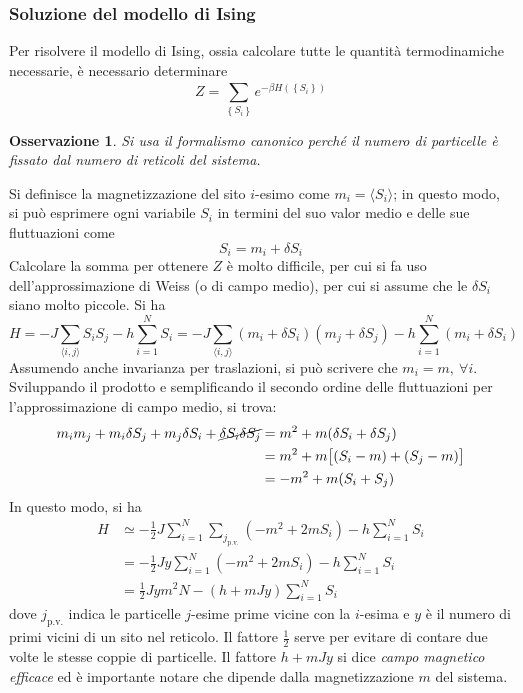 \documentclass[11pt, a4paper]{scrartcl}
\theoremstyle{style}
\newtheorem{osservazione}{Osservazione}[section]
\theoremstyle{style1}
\numberwithin{equation}{subsection}
\begin{document}
\subsubsection{Soluzione del modello di Ising}
Per risolvere il modello di Ising, ossia calcolare tutte le quantit\`a termodinamiche necessarie, \`e necessario determinare 
\[
Z = \sum_{\left\{ S_i \right\} }^{} e^{-\beta H\left(\left\{ S_i \right\} \right) }
\] 
\begin{osservazione}
Si usa il formalismo canonico perch\'e il numero di particelle \`e fissato dal numero di reticoli del sistema.
\end{osservazione}
\noindent Si definisce la magnetizzazione del sito $i$-esimo come $m_i = \langle S_i \rangle$; in questo modo, si pu\`o esprimere ogni variabile $S_i$ in termini del suo valor medio e delle sue fluttuazioni come 
\[
S_i = m_i + \delta S_i
\] 
Calcolare la somma per ottenere $Z$ \`e molto difficile, per cui si fa uso dell'approssimazione di Weiss (o di campo medio), per cui si assume che le $\delta S_i$ siano molto piccole.
Si ha
\[
H = - J  \sum_{\langle i,j \rangle}^{} S_iS_j - h \sum_{i=1}^{N} S_i = - J \sum_{\langle i,j \rangle}^{} (m_i + \delta S_i) (m_j + \delta S_j) - h \sum_{i=1}^{N} (m_i+ \delta S_i)
\] 
Assumendo anche invarianza per traslazioni, si pu\`o scrivere che $m_i = m, \ \forall i$.
Sviluppando il prodotto e semplificando il secondo ordine delle fluttuazioni per l'approssimazione di campo medio, si trova:
\[
	\begin{split}
		m_i m_j + m_i \delta S_j + m_j \delta S_i + \cancel{\delta S_i \delta S_j}&=m^2 + m(\delta S_i + \delta S_j)\\
											  &=m^2 + m \big[ (S_i - m) + (S_j - m) \big] \\
											  &= -m^2 + m(S_i + S_j)
	\end{split}
\] 
In questo modo, si ha
\[
	\begin{split}
		H &\simeq -\frac{1}{2} J \sum_{i=1}^{N} \sum_{j_\text{p.v.}}^{} (-m^2+2mS_i) - h \sum_{i=1}^{N} S_i\\
		  &= - \frac{1}{2}J y  \sum_{i=1}^{N} (-m^2+2mS_i) - h \sum_{i=1}^{N} S_i\\
		  &= \frac{1}{2}Jy m^2 N - (h + mJy) \sum_{i=1}^{N} S_i
	\end{split}
\] 
dove $j_\text{p.v.}$ indica le particelle $j$-esime prime vicine con la $i$-esima e $y$ \`e il numero di primi vicini di un sito nel reticolo.
Il fattore $\frac{1}{2}$ serve per evitare di contare due volte le stesse coppie di particelle.
Il fattore $h+mJy$ si dice \textit{campo magnetico efficace} ed \`e importante notare che dipende dalla magnetizzazione $m$ del sistema.
\end{document}
